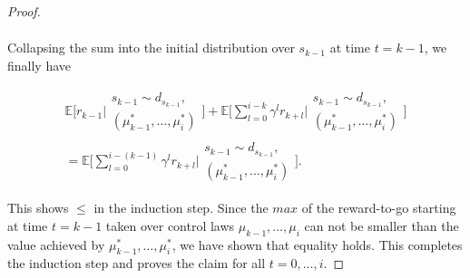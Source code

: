 \documentclass[11pt]{article} %
\begin{document}
\begin{proof}
\begin{equation}
\begin{array}{rll}
	\end{array}
\end{equation}

Collapsing the sum into the initial distribution over $s_{k-1}$ at time $t = k-1$, we finally have

\begin{equation}
	\begin{array}{rcl}
		\mathbb{E}\Big[ r_{k-1} \Big| \begin{array}{c}
											s_{k-1} \sim d_{s_{k-1}}, \\
											(\mu_{k-1}^*,\dots,\mu_i^*)
										\end{array} \Big] + \mathbb{E}\Big[ \sum\limits_{l=0}^{i-k} \gamma^l r_{k+l} \Big| \begin{array}{c}
																																s_{k-1} \sim d_{s_{k-1}}, \\
																																(\mu_{k-1}^*,\dots,\mu_i^*)
																															\end{array} \Big] \\
		= \mathbb{E}\Big[ \sum\limits_{l=0}^{i-(k-1)} \gamma^l r_{k+l} \Big| \begin{array}{c}
																				s_{k-1} \sim d_{s_{k-1}}, \\
																				(\mu_{k-1}^*,\dots,\mu_i^*)
																			\end{array} \Big] .
	\end{array}
\end{equation}

This shows $\le$ in the induction step. Since the $max$ of the reward-to-go starting at time $t = k-1$ taken over control laws $\mu_{k-1},\dots,\mu_i$ can not be smaller than the value achieved by $\mu_{k-1}^*,\dots,\mu_i^*$, we have shown that equality holds. This completes the induction step and proves the claim for all $t = 0,\dots,i$.

\end{proof}
\end{document}
